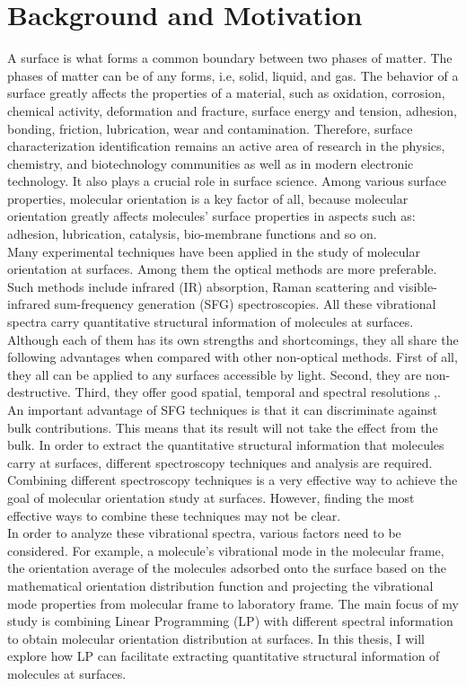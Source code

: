 \label{ch:1}
\section{Background and Motivation}
A surface is what forms a common boundary between two phases of matter. The phases of matter can be of any forms, i.e, solid, liquid, and gas. The behavior of a surface greatly affects the properties of a material, such as oxidation, corrosion, chemical activity, deformation and fracture, surface energy and tension, adhesion, bonding, friction, lubrication, wear and contamination. Therefore, surface characterization identification remains an active area of research in the physics, chemistry, and biotechnology communities as well as in modern electronic technology. It also plays a crucial role in surface science. Among various surface properties, molecular orientation is a key factor of all, because molecular orientation greatly affects molecules' surface properties in aspects such as: adhesion, lubrication, catalysis, bio-membrane functions and so on. \cite{PhysRevB.59.12632}\\

Many experimental techniques have been applied in the study of molecular orientation at surfaces. Among them the optical methods are more preferable. Such methods include infrared (IR) absorption, Raman scattering and visible-infrared sum-frequency generation (SFG) spectroscopies. All these vibrational spectra carry quantitative structural information of molecules at surfaces. Although each of them has its own strengths and shortcomings, they all share the following advantages when compared with other non-optical methods. First of all, they all can be applied to any surfaces accessible by light. Second, they are non-destructive. Third, they offer good spatial, temporal and spectral resolutions \cite{Brasselet:11},\cite{PhysRevB.59.12632}. An important advantage of SFG techniques is that it can discriminate against bulk contributions. This means that its result will not take the effect from the bulk. In order to extract the quantitative structural information that molecules carry at surfaces, different spectroscopy techniques and analysis are required. Combining different spectroscopy techniques is a very effective way to achieve the goal of molecular orientation study at surfaces. However, finding the most effective ways to combine these techniques may not be clear.\\

In order to analyze these vibrational spectra, various factors need to be considered. For example, a molecule's vibrational mode in the molecular frame, the orientation average of the molecules adsorbed onto the surface based on the mathematical orientation distribution function and projecting the vibrational mode properties from molecular frame to laboratory frame. The main focus of my study is combining Linear Programming (LP) with different spectral information to obtain molecular orientation distribution at surfaces. In this thesis, I will explore how LP can facilitate extracting quantitative structural information of molecules at surfaces.\\

